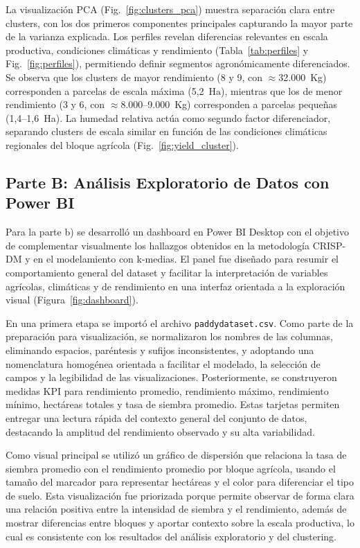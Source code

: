 \documentclass[10pt,a4paper]{article}
\begin{document}
La visualización PCA (Fig.~\ref{fig:clusters_pca}) muestra separación clara entre clusters, con los dos primeros componentes principales capturando la mayor parte de la varianza explicada. Los perfiles revelan diferencias relevantes en escala productiva, condiciones climáticas y rendimiento (Tabla~\ref{tab:perfiles} y Fig.~\ref{fig:perfiles}), permitiendo definir segmentos agronómicamente diferenciados. Se observa que los clusters de mayor rendimiento (8 y 9, con $\approx$32.000~Kg) corresponden a parcelas de escala máxima (5,2~Ha), mientras que los de menor rendimiento (3 y 6, con $\approx$8.000--9.000~Kg) corresponden a parcelas pequeñas (1,4--1,6~Ha). La humedad relativa actúa como segundo factor diferenciador, separando clusters de escala similar en función de las condiciones climáticas regionales del bloque agrícola (Fig.~\ref{fig:yield_cluster}).

\subsection{Parte B: Análisis Exploratorio de Datos con Power BI}

Para la parte b) se desarrolló un dashboard en Power BI Desktop con el objetivo de complementar visualmente los hallazgos obtenidos en la metodología CRISP-DM y en el modelamiento con k-medias. El panel fue diseñado para resumir el comportamiento general del dataset y facilitar la interpretación de variables agrícolas, climáticas y de rendimiento en una interfaz orientada a la exploración visual (Figura~\ref{fig:dashboard}).

En una primera etapa se importó el archivo \texttt{paddydataset.csv}. Como parte de la preparación para visualización, se normalizaron los nombres de las columnas, eliminando espacios, paréntesis y sufijos inconsistentes, y adoptando una nomenclatura homogénea orientada a facilitar el modelado, la selección de campos y la legibilidad de las visualizaciones. Posteriormente, se construyeron medidas KPI para rendimiento promedio, rendimiento máximo, rendimiento mínimo, hectáreas totales y tasa de siembra promedio. Estas tarjetas permiten entregar una lectura rápida del contexto general del conjunto de datos, destacando la amplitud del rendimiento observado y su alta variabilidad.

Como visual principal se utilizó un gráfico de dispersión que relaciona la tasa de siembra promedio con el rendimiento promedio por bloque agrícola, usando el tamaño del marcador para representar hectáreas y el color para diferenciar el tipo de suelo. Esta visualización fue priorizada porque permite observar de forma clara una relación positiva entre la intensidad de siembra y el rendimiento, además de mostrar diferencias entre bloques y aportar contexto sobre la escala productiva, lo cual es consistente con los resultados del análisis exploratorio y del clustering.
\end{document}
